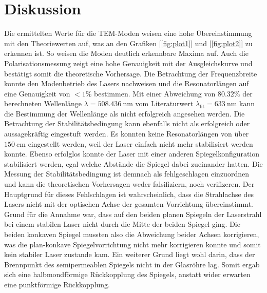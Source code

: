 \section{Diskussion}
\label{sec:Diskussion}
Die ermittelten Werte für die TEM-Moden weisen eine hohe Übereinstimmung mit den Theoriewerten auf, was an den Grafiken [\ref{fig:plot1}] und [\ref{fig:plot2}] zu erkennen ist.
So weisen die Moden deutlich erkennbare Maxima auf.
Auch die Polarisationsmessung zeigt eine hohe Genauigkeit mit der Ausgleichskurve und bestätigt somit die theoretische Vorhersage.
Die Betrachtung der Frequenzbreite konnte den Modenbetrieb des Lasers nachweisen und die Resonatorlängen auf eine Genauigkeit von $<1\%$ bestimmen. \newline
Mit einer Abweichung von $80.32\%$ der berechneten Wellenlänge $\lambda = \SI{508.436}{\nano\meter}$ vom Literaturwert $\lambda_\text{lit}=\SI{633}{\nano\meter}$ kann die Bestimmung der Wellenlänge
als nicht erfolgreich angesehen werden.
Die Betrachtung der Stabilitätsbedingung kann ebenfalls nicht als erfolgreich oder aussagekräftig eingestuft werden. Es konnten keine Resonatorlängen von über $\SI{150}{\centi\meter}$ eingestellt
werden, weil der Laser einfach nicht mehr stabilisiert werden konnte. Ebenso erfolglos konnte der Laser mit einer anderen Spiegelkonfiguration stabilisiert werden, egal welche Abstände die 
Spiegel dabei zueinander hatten. Die Messung der Stabilitätsbedingung ist demnach als fehlgeschlagen einzuordnen und kann die theoretischen Vorhersagen weder falsifiziern, noch verifizeren. \newline
Der Hauptgrund für dieses Fehlschlagen ist wahrscheinlich, dass die Strahlachse des Lasers nicht mit der optischen Achse der gesamten Vorrichtung übereinstimmt. Grund für die Annahme war,
dass auf den beiden planen Spiegeln der Laserstrahl bei einem stabilen Laser nicht durch die Mitte der beiden Spiegel ging. Die beiden konkaven Spiegel mussten also die Abweichung beider 
Achsen korrigieren, was die plan-konkave Spiegelvorrichtung nicht mehr korrigieren konnte und somit kein stabiler Laser zustande kam.
Ein weiterer Grund liegt wohl darin, dass der Brennpunkt des semipermeablen Spiegels nicht in der Glasröhre lag. Somit ergab sich eine halbmondförmige Rückkopplung des Spiegels, anstatt wider erwarten
eine punktförmige Rückkopplung.
